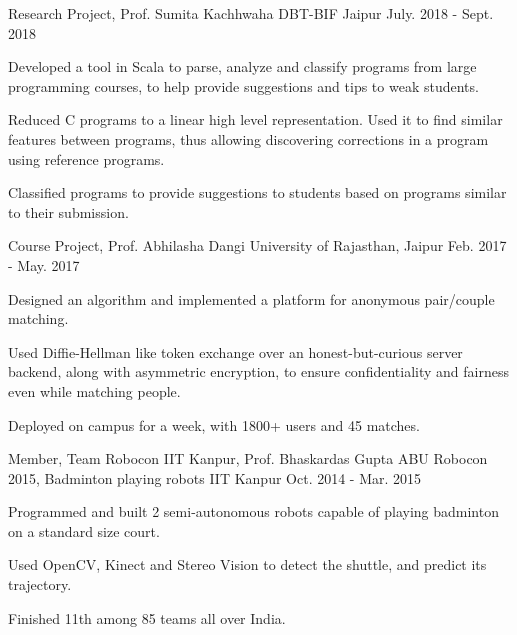 

\begin{cventries}

  \cventry
  {Research Project, Prof. Sumita Kachhwaha}
  {\href{https://github.com/DBT-BIF/Biosensor-Python}{}
    {}}
  {DBT-BIF Jaipur}
  {July. 2018 - Sept. 2018}
  {
    \begin{cvitems}
    \item Developed a tool in Scala to parse, analyze and classify  programs from large programming courses, to help provide
      suggestions and tips to weak students.
    \item Reduced C programs to a linear high level representation. Used it to find similar features between programs, thus allowing discovering corrections in a program using reference programs.
    \item Classified programs to provide suggestions to students based on programs similar to their submission.
    \end{cvitems}
  }
  \cventry
  {Course Project, Prof. Abhilasha Dangi}
  {\href{https://github.com/pclubiitk/puppy-love}{}}
  {University of Rajasthan, Jaipur}
  {Feb. 2017 - May. 2017}
  {
    \begin{cvitems}
      \item Designed an algorithm and implemented a platform
        for anonymous pair/couple matching.
      \item Used Diffie-Hellman like token exchange over an
        honest-but-curious server backend, along with asymmetric encryption, to
        ensure confidentiality and fairness even while matching people.
      \item Deployed on campus for a week, with 1800+ users and 45 matches.
    \end{cvitems}
  }
  \cventry
  {Member, Team Robocon IIT Kanpur, Prof. Bhaskardas Gupta}
  {ABU Robocon 2015, Badminton playing robots}
  {IIT Kanpur}
  {Oct. 2014 - Mar. 2015}
  {
    \begin{cvitems}
    \item Programmed and built 2 semi-autonomous robots
      capable of playing badminton on a standard size court.
    \item Used OpenCV, Kinect and Stereo Vision to detect the shuttle,
      and predict its trajectory.
    \item Finished 11th among 85 teams all over India.
    \end{cvitems}
  }  
  

\end{cventries}

